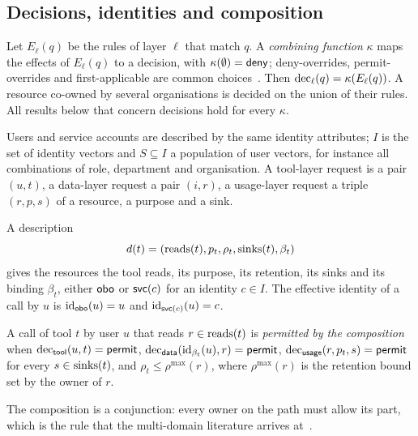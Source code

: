 \subsection{Decisions, identities and composition}
Let $E_\ell(q)$ be the rules of layer $\ell$ that match $q$. A \emph{combining function} $\kappa$ maps the effects of $E_\ell(q)$ to a decision, with $\kappa(\emptyset) = \mathsf{deny}$; deny-overrides, permit-overrides and first-applicable are common choices~\cite{oasis2013xacml}. Then $\mathrm{dec}_\ell(q) = \kappa(E_\ell(q))$. A resource co-owned by several organisations is decided on the union of their rules. All results below that concern decisions hold for every $\kappa$.

Users and service accounts are described by the same identity attributes; $I$ is the set of identity vectors and $S \subseteq I$ a population of user vectors, for instance all combinations of role, department and organisation. A tool-layer request is a pair $(u, t)$, a data-layer request a pair $(i, r)$, a usage-layer request a triple $(r, p, s)$ of a resource, a purpose and a sink.

\begin{definition}\label{def:tool}
A description
\[d(t) = (\mathrm{reads}(t), p_t, \rho_t, \mathrm{sinks}(t), \beta_t)\]
gives the resources the tool reads, its purpose, its retention, its sinks and its binding $\beta_t$, either $\mathsf{obo}$ or $\mathsf{svc}(c)$ for an identity $c \in I$. The effective identity of a call by $u$ is $\mathrm{id}_{\mathsf{obo}}(u) = u$ and $\mathrm{id}_{\mathsf{svc}(c)}(u) = c$.
\end{definition}

\begin{definition}[Composition]\label{def:composition}
A call of tool $t$ by user $u$ that reads $r \in \mathrm{reads}(t)$ is \emph{permitted by the composition} when $\mathrm{dec}_{\mathsf{tool}}(u, t) = \mathsf{permit}$, $\mathrm{dec}_{\mathsf{data}}(\mathrm{id}_{\beta_t}(u), r) = \mathsf{permit}$, $\mathrm{dec}_{\mathsf{usage}}(r, p_t, s) = \mathsf{permit}$ for every $s \in \mathrm{sinks}(t)$, and $\rho_t \le \rho^{\max}(r)$, where $\rho^{\max}(r)$ is the retention bound set by the owner of $r$.
\end{definition}
The composition is a conjunction: every owner on the path must allow its part, which is the rule that the multi-domain literature arrives at~\cite{bonatti2002algebra,gong1996interop}.

